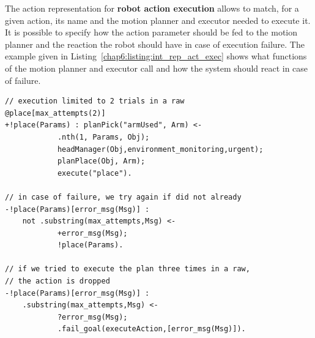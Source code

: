 \documentclass[a4paper,11pt,twoside]{StyleThese}
\begin{document}
\bigskip

The action representation for \textbf{robot action execution} allows to match, for a given action, its name and the motion planner and executor needed to execute it. It is possible to specify how the action parameter should be fed to the motion planner and the reaction the robot should have in case of execution failure. The example given in Listing~\ref{chap6:listing:int_rep_act_exec} shows what functions of the motion planner and executor call and how the system should react in case of failure.
\begin{lstlisting}[label=chap6:listing:int_rep_act_exec,style=aslDef, frame=single, caption={Example of an internal action definition for a robot action. The first Jason plan specifies what function to call to execute the Place action. The second plan describes what should be done in case of action planning or execution failure. The third plan is triggered when the first plan has already been tried twice and was requested for a third time. In this case, the failure is signaled at the plan level.}]
// execution limited to 2 trials in a raw
@place[max_attempts(2)] 
+!place(Params) : planPick("armUsed", Arm) <-
			.nth(1, Params, Obj);
			headManager(Obj,environment_monitoring,urgent);
			planPlace(Obj, Arm);
			execute("place").
		
// in case of failure, we try again if did not already
-!place(Params)[error_msg(Msg)] : 
	not .substring(max_attempts,Msg) <-
			+error_msg(Msg);
			!place(Params).

// if we tried to execute the plan three times in a raw,
// the action is dropped	 
-!place(Params)[error_msg(Msg)] : 
	.substring(max_attempts,Msg) <-
			?error_msg(Msg);
			.fail_goal(executeAction,[error_msg(Msg)]).
\end{lstlisting}
\end{document}
